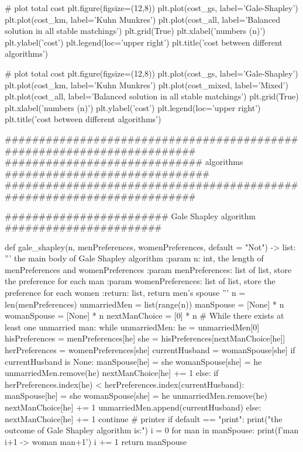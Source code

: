 \documentclass[14pt]{extarticle}
\begin{document}
\begin{python}
    # plot total cost
    plt.figure(figsize=(12,8))
    plt.plot(cost_gs, label='Gale-Shapley')
    plt.plot(cost_km, label='Kuhn Munkres')
    plt.plot(cost_all, label='Balanced solution in all stable matchings')
    plt.grid(True)
    plt.xlabel('numbers (n)')
    plt.ylabel('cost')
    plt.legend(loc='upper right')
    plt.title('cost between different algorithms') 

    # plot total cost
    plt.figure(figsize=(12,8))
    plt.plot(cost_gs, label='Gale-Shapley')
    plt.plot(cost_km, label='Kuhn Munkres')
    plt.plot(cost_mixed, label='Mixed')
    plt.plot(cost_all, label='Balanced solution in all stable matchings')
    plt.grid(True)
    plt.xlabel('numbers (n)')
    plt.ylabel('cost')
    plt.legend(loc='upper right')
    plt.title('cost between different algorithms') 

#######################################################################
############################# algorithms ##############################
#######################################################################

######################## Gale Shapley algorithm #######################

def gale_shapley(n, menPreferences, womenPreferences, default = "Not") -> list:
    '''
    the main body of Gale Shapley algorithm
    :param n: int, the length of menPreferences and womenPreferences
    :param menPreferences: list of list, store the preference for each man
    :param womenPreferences: list of list, store the preference for each women
    :return: list, return men's spouse
    '''
    n = len(menPreferences)
    unmarriedMen = list(range(n))
    manSpouse = [None] * n
    womanSpouse = [None] * n
    nextManChoice = [0] * n
    # While there exists at least one unmarried man:
    while unmarriedMen:
        he = unmarriedMen[0]
        hisPreferences = menPreferences[he]
        she = hisPreferences[nextManChoice[he]]
        herPreferences = womenPreferences[she]
        currentHusband = womanSpouse[she]
        if currentHusband is None:
            manSpouse[he] = she
            womanSpouse[she] = he
            unmarriedMen.remove(he)
            nextManChoice[he] += 1
        else:
            if herPreferences.index(he) < herPreferences.index(currentHusband):
                manSpouse[he] = she
                womanSpouse[she] = he
                unmarriedMen.remove(he)
                nextManChoice[he] += 1
                unmarriedMen.append(currentHusband)
            else:
                nextManChoice[he] += 1
                continue
    # printer        
    if default == "print":
        print("the outcome of Gale Shapley algorithm is:")
        i = 0
        for man in manSpouse:
            print(f'man {i+1} -> woman {man+1}')
            i += 1
    return manSpouse


\end{python}
\end{document}
